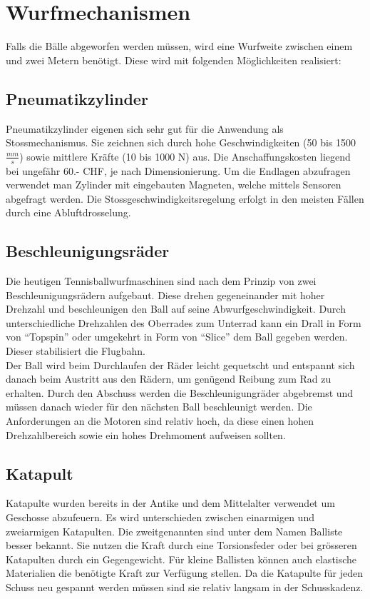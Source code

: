 \section{Wurfmechanismen}
Falls die Bälle abgeworfen werden müssen, wird eine Wurfweite zwischen einem und zwei Metern benötigt. Diese wird mit folgenden Möglichkeiten realisiert:

\subsection{Pneumatikzylinder}
Pneumatikzylinder eigenen sich sehr gut für die Anwendung als Stossmechanismus. Sie zeichnen sich durch hohe Geschwindigkeiten (50 bis 1500 $\frac{mm}{s}$) sowie mittlere Kräfte (10 bis 1000 N) aus. Die Anschaffungskosten liegend bei ungefähr 60.- CHF, je nach Dimensionierung. Um die Endlagen abzufragen verwendet man Zylinder mit eingebauten Magneten, welche mittels Sensoren abgefragt werden. Die Stossgeschwindigkeitsregelung erfolgt in den meisten Fällen durch eine Abluftdrosselung.

\subsection{Beschleunigungsräder}
Die heutigen Tennisballwurfmaschinen sind nach dem Prinzip von zwei Beschleunigungsrädern aufgebaut. Diese drehen gegeneinander mit hoher Drehzahl und beschleunigen den Ball auf seine Abwurfgeschwindigkeit. Durch unterschiedliche Drehzahlen des Oberrades zum Unterrad kann ein Drall in Form von \enquote{Topspin} oder umgekehrt in Form von \enquote{Slice} dem Ball gegeben werden. Dieser stabilisiert die Flugbahn.\\
Der Ball wird beim Durchlaufen der Räder leicht gequetscht und entspannt sich danach beim Austritt aus den Rädern, um genügend Reibung zum Rad zu erhalten. Durch den Abschuss werden die Beschleunigungräder abgebremst und müssen danach wieder für den nächsten Ball beschleunigt werden. Die Anforderungen an die Motoren sind relativ hoch, da diese einen hohen Drehzahlbereich sowie ein hohes Drehmoment aufweisen sollten.

\subsection{Katapult}
Katapulte wurden bereits in der Antike und dem Mittelalter verwendet um Geschosse abzufeuern. Es wird unterschieden zwischen einarmigen und zweiarmigen Katapulten. Die zweitgenannten sind unter dem Namen Balliste besser bekannt. Sie nutzen die Kraft durch eine Torsionsfeder oder bei grösseren Katapulten durch ein Gegengewicht. Für kleine Ballisten können auch elastische Materialien die benötigte Kraft zur Verfügung stellen. Da die Katapulte für jeden Schuss neu gespannt werden müssen sind sie relativ langsam in der Schusskadenz. 


